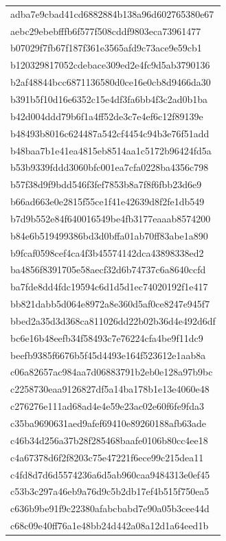 \begin{tabular}{l}
adba7e9cbad41cd6882884b138a96d602765380e67 \\
aebc29ebebfffb6f577f508cddf9803eca73961477 \\
b07029f7fb67f187f361e3565afd9c73ace9e59cb1 \\
b120329817052cdebace309ed2e4fc9d5ab3790136 \\
b2af48844bcc6871136580d0ce16e0cb8d9466da30 \\
b391b5f10d16e6352c15e4df3fa6bb4f3c2ad0b1ba \\
b42d004ddd79b6f1a4ff52de3c7e4ef6c12f89139e \\
b48493b8016c624487a542cf4454c94b3e76f51add \\
b48baa7b1e41ea4815eb8514aa1c5172b96424fd5a \\
b53b9339fddd3060bfc001ea7cfa0228ba4356c798 \\
b57f38d9f9bdd546f3fef7853b8a7f8f6fbb23d6e9 \\
b66ad663e0e2815f55ce1f41e42639d8f2fe1db549 \\
b7d9b552e84f640016549be4fb3177eaaab8574200 \\
b84e6b519499386bd3d0bffa01ab70ff83abe1a890 \\
b9fcaf0598cef4ca4f3b45574142dca43898338ed2 \\
ba4856f8391705e58aecf32d6b74737c6a8640ccfd \\
ba7fde8dd4fdc19594c6d1d5d1ec74020192f1e417 \\
bb821dabb5d064e8972a8e360d5af0ce8247e945f7 \\
bbed2a35d3d368ca811026dd22b02b36d4e492d6df \\
bc6e16b48eefb34f58493c7e76224cfa4be9f11dc9 \\
beefb9385f6676b5f45d4493e164f523612e1aab8a \\
c06a82657ac984aa7d06883791b2eb0e128a97b9bc \\
c2258730eaa9126827df5a14ba178b1e13e4060e48 \\
c276276e111ad68ad4e4e59e23ac02e60f6fe9fda3 \\
c35ba9690631aed9afef69410e89260188afb63ade \\
c46b34d256a37b28f285468baafe0106b80cc4ee18 \\
c4a67378d6f2f8203c75e47221f6ece99c215dea11 \\
c4fd8d7d6d5574236a6d5ab960caa9484313e0ef45 \\
c53b3c297a46eb9a76d9c5b2db17ef4b515f750ea5 \\
c636b9be91f9c22380afabcbabd7e90a05b3cee44d \\
c68c09e40ff76a1e48bb24d442a08a12d1a64eed1b \\

\end{tabular}
